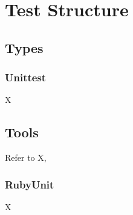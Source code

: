 
\chapter{Test Structure} %

\label{Part9Chapter3} %



\section{Types}



\subsection{Unittest}

X


\section{Tools}

Refer to X,


\subsection{RubyUnit}

X